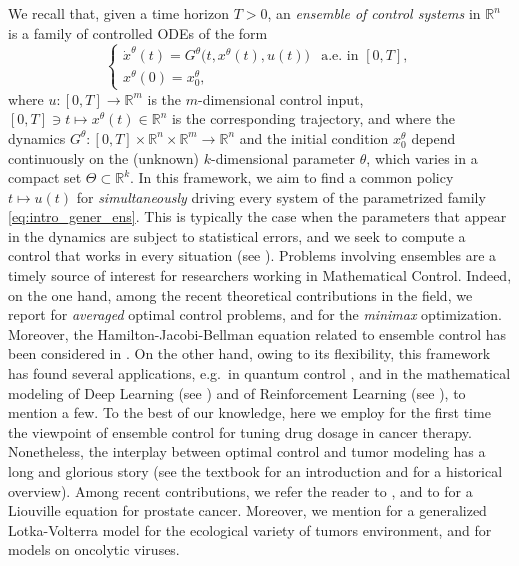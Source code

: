 \documentclass[a4paper,12pt, reqno]{amsart}
\theoremstyle{plain}
\theoremstyle{definition}
\theoremstyle{remark}
\numberwithin{equation}{section}
\newcommand{\R}{\mathbb{R}}
\begin{document}
We recall that{, given a time horizon $T>0$,} an \emph{ensemble of control systems} {in $\R^n$} is a family of controlled ODEs of the form 
\begin{equation} \label{eq:intro_gener_ens}
    \begin{cases}
        \dot x^\theta(t) = G^\theta\big(t, x^\theta(t), u(t) \big) & \mbox{a.e. in } [0,T], \\
        x^\theta(0) = x_0^\theta,
    \end{cases}
\end{equation}
where $u\colon [0,T] \to \R^m$ is the {$m$-dimensional} control {input, $[0,T]\ni t\mapsto x^\theta(t) \in \R^n$ is the corresponding trajectory}, and where the dynamics $G^\theta\colon [0,T]\times \R^n\times \R^m\to\R^n$ and the initial condition $x_0^\theta$ depend continuously on the (unknown) {$k$-dimensional} parameter $\theta$, which varies in a compact set $\Theta\subset \R^k$. 
In this framework, we aim to find a common policy $t \mapsto u(t)$ for \emph{simultaneously} driving every system of the parametrized family \eqref{eq:intro_gener_ens}. 
This is typically the case when the parameters that appear in the dynamics are subject to statistical errors, and we seek to compute a control that works in every situation (see \cite{RuLi12}). 
Problems involving ensembles are a timely source of interest for researchers working in Mathematical Control. Indeed, on the one hand, among the recent theoretical contributions in the field, we report \cite{aronna2025average,BK19,BK24} for \emph{averaged} optimal control problems, and \cite{AB25,Scag25} for the \emph{minimax} optimization.
Moreover, the Hamilton-Jacobi-Bellman equation related to ensemble control has been considered in \cite{aronna2024dynamic}.
On the other hand, owing to its flexibility, this framework has found several applications, e.g.~in quantum control \cite{AuBoSi18,ChiGau18,RABS}, and in the mathematical modeling of Deep Learning (see \cite{RuZu23,ASZu,ABR24,Cipriani2025}) and of Reinforcement Learning (see \cite{MP18,PPF21}), to mention a few.
To the best of our knowledge, here we employ for the first time the viewpoint of ensemble control for tuning drug dosage in cancer therapy. 
Nonetheless, the interplay between optimal control and tumor modeling has a long and glorious story (see the textbook \cite{schattler2015optimal} for an introduction and for a historical overview).
Among recent contributions, we refer the reader to \cite{cunningham2018optimal,ledzewicz2024optimal}, and to \cite{edduweh2024liouville} for a Liouville equation for prostate cancer. Moreover, we mention 
\cite{aguade2024modeling} for a generalized Lotka-Volterra model for the ecological variety of tumors environment, and \cite{morselli2023agent,morselli2024hybrid} for models on oncolytic viruses.
\end{document}
